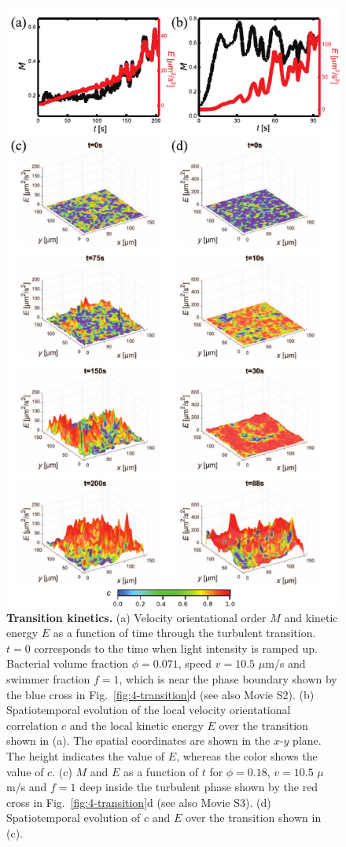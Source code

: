 \begin{figure}[!htbp]
	\begin{center}
	\includegraphics[height=5.5 in]{Figs/4-Emergence/3.pdf}
	\end{center}
	\caption[Transition kinetics]
	{
	\textbf{Transition kinetics.}
  (a) Velocity orientational order $M$ and kinetic energy $E$ as a function of time through the turbulent transition. $t = 0$ corresponds to the time when light intensity is ramped up. Bacterial volume fraction $\phi = 0.071$, speed $v = 10.5$ $\mu$m/s and swimmer fraction $f = 1$, which is near the phase boundary shown by the blue cross in Fig.~\ref{fig:4-transition}d (see also Movie S2).
  (b) Spatiotemporal evolution of the local velocity orientational correlation $c$ and the local kinetic energy $E$ over the transition shown in (a). The spatial coordinates are shown in the $x$-$y$ plane. The height indicates the value of $E$, whereas the color shows the value of $c$.
  (c) $M$ and $E$ as a function of $t$ for $\phi = 0.18$, $v = 10.5$ $\mu$m/s and $f = 1$ deep inside the turbulent phase shown by the red cross in Fig.~\ref{fig:4-transition}d (see also Movie S3).
  (d) Spatiotemporal evolution of $c$ and $E$ over the transition shown in (c).
	}
	\label{fig:4-kinetics}
\end{figure}



